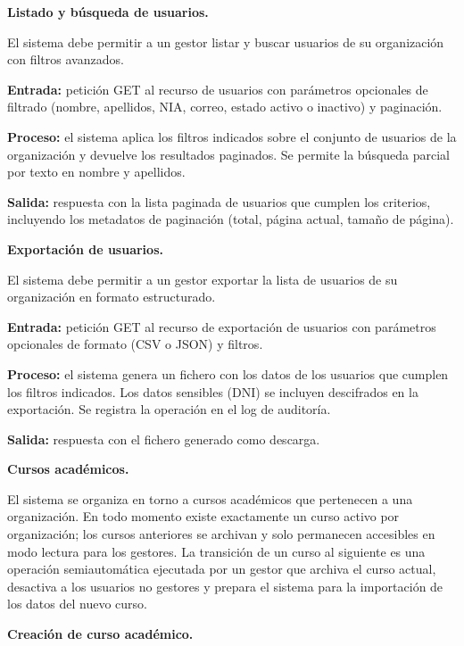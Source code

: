 \begin{functional}
\begin{functional}
    \item \textbf{Listado y búsqueda de usuarios.}

    El sistema debe permitir a un gestor listar y buscar usuarios de su organización con filtros avanzados.

    \textbf{Entrada:} petición GET al recurso de usuarios con parámetros opcionales de filtrado (nombre, apellidos, NIA, correo, estado activo o inactivo) y paginación.

    \textbf{Proceso:} el sistema aplica los filtros indicados sobre el conjunto de usuarios de la organización y devuelve los resultados paginados. Se permite la búsqueda parcial por texto en nombre y apellidos.

    \textbf{Salida:} respuesta con la lista paginada de usuarios que cumplen los criterios, incluyendo los metadatos de paginación (total, página actual, tamaño de página).

    \item \textbf{Exportación de usuarios.}

    El sistema debe permitir a un gestor exportar la lista de usuarios de su organización en formato estructurado.

    \textbf{Entrada:} petición GET al recurso de exportación de usuarios con parámetros opcionales de formato (CSV o JSON) y filtros.

    \textbf{Proceso:} el sistema genera un fichero con los datos de los usuarios que cumplen los filtros indicados. Los datos sensibles (DNI) se incluyen descifrados en la exportación. Se registra la operación en el log de auditoría.

    \textbf{Salida:} respuesta con el fichero generado como descarga.

  \end{functional}

  \item \textbf{Cursos académicos.}

  El sistema se organiza en torno a cursos académicos que pertenecen a una organización. En todo momento existe exactamente un curso activo por organización; los cursos anteriores se archivan y solo permanecen accesibles en modo lectura para los gestores. La transición de un curso al siguiente es una operación semiautomática ejecutada por un gestor que archiva el curso actual, desactiva a los usuarios no gestores y prepara el sistema para la importación de los datos del nuevo curso.

  \begin{functional}
    \item \textbf{Creación de curso académico.}


\end{functional}
\end{functional}
